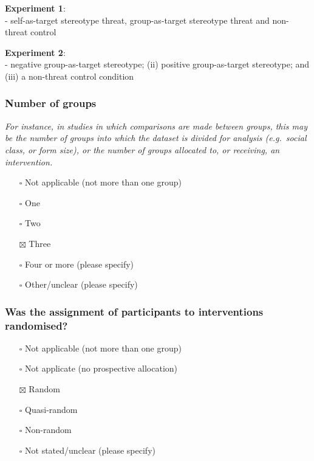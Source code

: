 \documentclass[
  doc, a4paper]{apa7}
\providecommand{\tightlist}{%
  \setlength{\itemsep}{0pt}\setlength{\parskip}{0pt}}
\begin{document}
\textbf{Experiment 1}:\\
- self-as-target stereotype threat, group-as-target stereotype threat and non-threat control

\textbf{Experiment 2}:\\
- negative group-as-target stereotype; (ii) positive group-as-target stereotype; and (iii) a non-threat control condition

\subsubsection{Number of groups}\label{number-of-groups}

\emph{For instance, in studies in which comparisons are made between groups, this may be the number of groups into which the dataset is divided for analysis (e.g.~social class, or form size), or the number of groups allocated to, or receiving, an intervention.}

\begin{itemize}
\tightlist
\item[$\square$]
  Not applicable (not more than one group)\\
\item[$\square$]
  One\\
\item[$\square$]
  Two\\
\item[$\boxtimes$]
  Three\\
\item[$\square$]
  Four or more (please specify)\\
\item[$\square$]
  Other/unclear (please specify)
\end{itemize}

\subsubsection{Was the assignment of participants to interventions randomised?}\label{was-the-assignment-of-participants-to-interventions-randomised}

\begin{itemize}
\tightlist
\item[$\square$]
  Not applicable (not more than one group)\\
\item[$\square$]
  Not applicate (no prospective allocation)\\
\item[$\boxtimes$]
  Random\\
\item[$\square$]
  Quasi-random\\
\item[$\square$]
  Non-random\\
\item[$\square$]
  Not stated/unclear (please specify)
\end{itemize}
\end{document}
